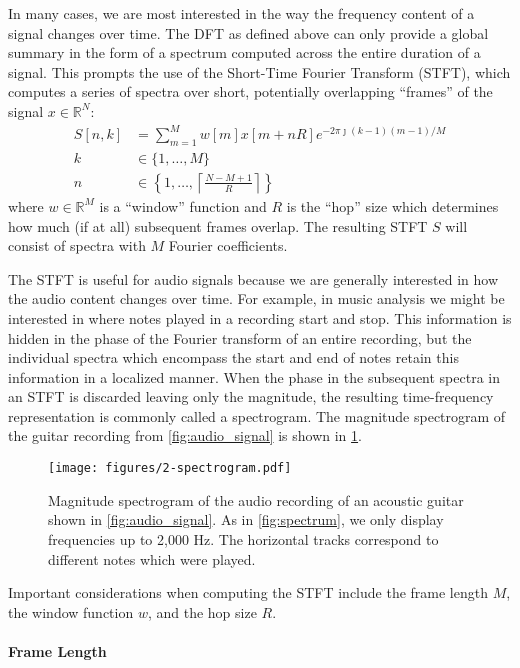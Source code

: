 In many cases, we are most interested in the way the frequency content of a signal changes over time.
The DFT as defined above can only provide a global summary in the form of a spectrum computed across the entire duration of a signal.
This prompts the use of the Short-Time Fourier Transform (STFT), which computes a series of spectra over short, potentially overlapping ``frames'' of the signal $x \in \mathbb{R}^N$:
\begin{align}
        S[n, k] &= \sum_{m = 1}^M w[m]x[m + nR] e^{-2\pi \jmath (k - 1)(m - 1)/M}\\
        k &\in \{1, \ldots, M\}\\
        n &\in \left\{1, \ldots, \left\lceil \frac{N - M + 1}{R} \right\rceil \right\}
\end{align}
where $w \in \mathbb{R}^{M}$ is a ``window'' function and $R$ is the ``hop'' size which determines how much (if at all) subsequent frames overlap.
The resulting STFT $S$ will consist of spectra with $M$ Fourier coefficients.

The STFT is useful for audio signals because we are generally interested in how the audio content changes over time.
For example, in music analysis we might be interested in where notes played in a recording start and stop.
This information is hidden in the phase of the Fourier transform of an entire recording, but the individual spectra which encompass the start and end of notes retain this information in a localized manner.
When the phase in the subsequent spectra in an STFT is discarded leaving only the magnitude, the resulting time-frequency representation is commonly called a spectrogram.
The magnitude spectrogram of the guitar recording from \cref{fig:audio_signal} is shown in \cref{fig:spectrogram}.

\begin{figure}
  \centering
  \texttt{[image: figures/2-spectrogram.pdf]}
  \caption[Magnitude spectrogram of the acoustic guitar recording]{Magnitude spectrogram of the audio recording of an acoustic guitar shown in \cref{fig:audio_signal}.
  As in \cref{fig:spectrum}, we only display frequencies up to 2,000 Hz.
  The horizontal tracks correspond to different notes which were played.}
  \label{fig:spectrogram}
\end{figure}

Important considerations when computing the STFT include the frame length $M$, the window function $w$, and the hop size $R$.

\paragraph{Frame Length}

